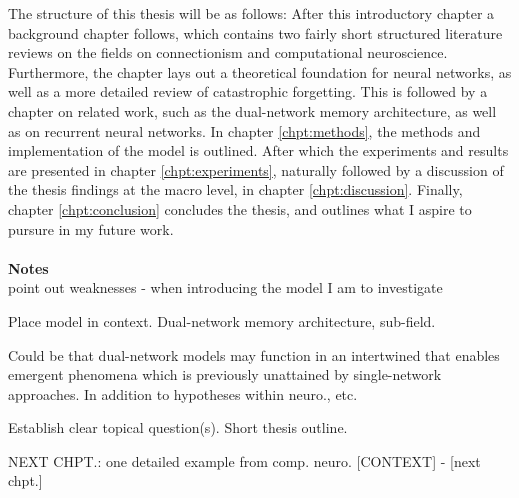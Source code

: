 The structure of this thesis will be as follows: After this introductory chapter a background chapter follows, which contains two fairly short structured literature reviews on the fields on connectionism and computational neuroscience. Furthermore, the chapter lays out a theoretical foundation for neural networks, as well as a more detailed review of catastrophic forgetting. This is followed by a chapter on related work, such as the dual-network memory architecture, as well as on recurrent neural networks. In chapter \ref{chpt:methods}, the methods and implementation of the model is outlined. After which the experiments and results are presented in chapter \ref{chpt:experiments}, naturally followed by a discussion of the thesis findings at the macro level, in chapter \ref{chpt:discussion}. Finally, chapter \ref{chpt:conclusion} concludes the thesis, and outlines what I aspire to pursure in my future work.
\\\\


\textbf{Notes}
\\



point out weaknesses - when introducing the model I am to investigate

Place model in context.
Dual-network memory architecture, sub-field.

Could be that dual-network models may function in an intertwined that enables emergent phenomena which is previously unattained by single-network approaches. In addition to hypotheses within neuro., etc.

Establish clear topical question(s).
Short thesis outline.


NEXT CHPT.:
one detailed example from comp. neuro. [CONTEXT] - [next chpt.]

\cleardoublepage